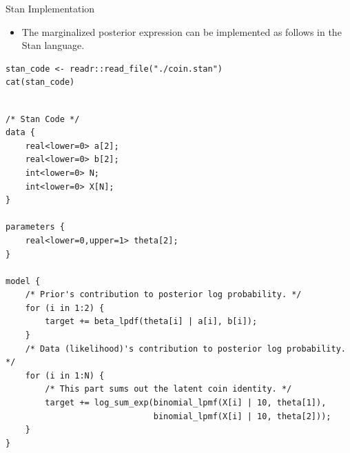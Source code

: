 \documentclass[dvipdfmx,bigger,aspectratio=169]{beamer}
\begin{document}
\begin{frame}[fragile,allowframebreaks,label=,t]{Stan Implementation}
 \begin{itemize}
\item The marginalized posterior expression can be implemented as follows in the Stan language.
\end{itemize}
\scriptsize
\begin{verbatim}
stan_code <- readr::read_file("./coin.stan")
cat(stan_code)
\end{verbatim}

\begin{verbatim}

/* Stan Code */
data {
    real<lower=0> a[2];
    real<lower=0> b[2];
    int<lower=0> N;
    int<lower=0> X[N];
}

parameters {
    real<lower=0,upper=1> theta[2];
}

model {
    /* Prior's contribution to posterior log probability. */
    for (i in 1:2) {
        target += beta_lpdf(theta[i] | a[i], b[i]);
    }
    /* Data (likelihood)'s contribution to posterior log probability. */
    for (i in 1:N) {
        /* This part sums out the latent coin identity. */
        target += log_sum_exp(binomial_lpmf(X[i] | 10, theta[1]),
                              binomial_lpmf(X[i] | 10, theta[2]));
    }
}
\end{verbatim}

\normalsize
\scriptsize
\normalsize
\end{frame}
\end{document}

